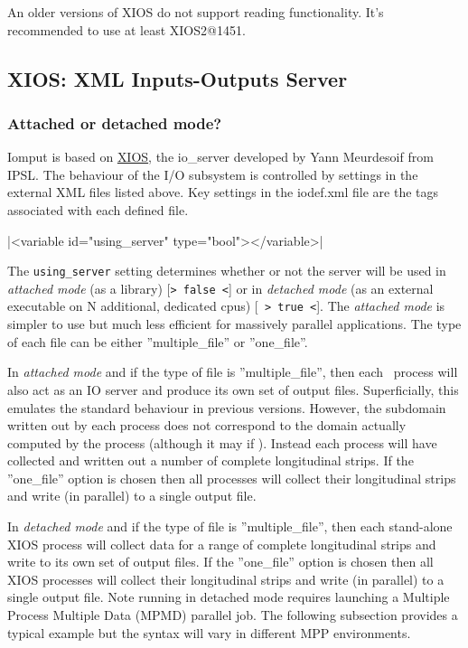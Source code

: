 \documentclass[../main/NEMO_manual]{subfiles}
\begin{document}
An older versions of XIOS do not support reading functionality. It's recommended to use at least XIOS2@1451.

\subsection{XIOS: XML Inputs-Outputs Server}

\subsubsection{Attached or detached mode?}

Iomput is based on \href{http://forge.ipsl.jussieu.fr/ioserver/wiki}{XIOS},
the io\_server developed by Yann Meurdesoif from IPSL.
The behaviour of the I/O subsystem is controlled by settings in the external XML files listed above.
Key settings in the iodef.xml file are the tags associated with each defined file.

\xmlline|<variable id="using_server" type="bool"></variable>|

The \texttt{using\_server} setting determines whether or not the server will be used in
\textit{attached mode}
(as a library) [\texttt{> false <}] or in \textit{detached mode}
(as an external executable on N additional, dedicated cpus) [\texttt{ > true <}].
The \textit{attached mode} is simpler to use but much less efficient for
massively parallel applications.
The type of each file can be either ''multiple\_file'' or ''one\_file''.

In \textit{attached mode} and if the type of file is ''multiple\_file'',
then each \NEMO\ process will also act as an IO server and produce its own set of output files.
Superficially, this emulates the standard behaviour in previous versions.
However, the subdomain written out by each process does not correspond to
the  domain actually computed by the process (although it may if ).
Instead each process will have collected and written out a number of complete longitudinal strips.
If the ''one\_file'' option is chosen then all processes will collect their longitudinal strips and
write (in parallel) to a single output file.

In \textit{detached mode} and if the type of file is ''multiple\_file'',
then each stand-alone XIOS process will collect data for a range of complete longitudinal strips and
write to its own set of output files.
If the ''one\_file'' option is chosen then all XIOS processes will collect their longitudinal strips and
write (in parallel) to a single output file.
Note running in detached mode requires launching a Multiple Process Multiple Data (MPMD) parallel job.
The following subsection provides a typical example but the syntax will vary in different MPP environments.
\end{document}
